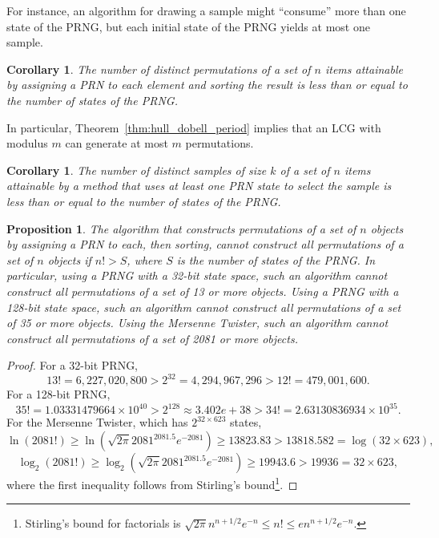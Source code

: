 \documentclass[12pt]{article}
\newtheorem{corollary}[theorem]{Corollary}
\newtheorem{proposition}[theorem]{Proposition}
\newcommand{\todo}[1]{{\color{red}{TO DO: \sc #1}}}
\begin{document}
For instance, an algorithm for drawing a sample might ``consume'' more than one state of the PRNG, but each initial state of the PRNG yields at most one sample.

\begin{corollary}
The number of distinct permutations of a set of $n$ items attainable by assigning a PRN to each element and sorting the result is less than or equal to the number of states of the PRNG.
\end{corollary}

In particular, Theorem~\ref{thm:hull_dobell_period} implies that an LCG with modulus $m$ can generate at most $m$ permutations.


\begin{corollary}
The number of distinct samples of size $k$ of a set of $n$ items attainable by a method that uses at least one PRN state to select the sample is less than or equal to the number of states of the PRNG.
\end{corollary}

\begin{proposition}
The algorithm that constructs permutations of a set of $n$ objects by assigning a PRN to each, then sorting, cannot construct all permutations of a set of $n$ objects if $n! > S$, where $S$ is the number of states of the PRNG. 
In particular, using a PRNG with a 32-bit state space, such an algorithm cannot construct all permutations of a set of 13 or more objects.
Using a PRNG with a 128-bit state space, such an algorithm cannot construct all permutations of a set of 35 or more objects.
Using the Mersenne Twister, such an algorithm cannot construct all permutations of a set of 2081 or more objects.
\end{proposition}


\begin{proof}
For a 32-bit PRNG,
$$13! = 6,227,020,800 > 2^{32} = 4,294,967,296 > 12! = 479,001,600.$$
For a 128-bit PRNG,
$$ 35! = 1.03331479664 \times 10^{40} > 2^{128} \approx 3.402e+38 > 34! = 2.63130836934 \times 10^{35}. $$
For the Mersenne Twister, which has $2^{32 \times 623}$ states, \todo{I think the following line is wrong?}
 $$ \ln (2081!) \ge \ln\left( \sqrt{2 \pi} 2081^{2081.5} e^{-2081} \right) \ge 13823.83 > 13818.582 = \log(32 \times 623),$$
 $$ \log_2(2081 !) \ge \log_2\left( \sqrt{2 \pi} 2081^{2081.5} e^{-2081} \right) \ge 19943.6 > 19936 = 32 \times 623,$$
where the first inequality follows from Stirling's bound\footnote{
Stirling's bound for factorials is $ \sqrt{2 \pi} n^{n+1/2} e^{-n} \le n! \le e n^{n+1/2} e^{-n}$.}.
\end{proof}
\end{document}
